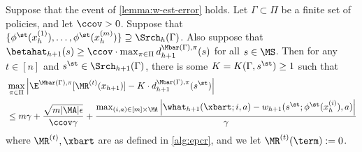 






\begin{lemma}\label{lemma:target-error-trunc}
Suppose that the event of \cref{lemma:w-est-error} holds. Let $\Gamma \subset \Pi$ be a finite set of policies, and let $\ccov > 0$. Suppose that $\{\phi^\st(x_h^{(1)}),\dots,\phi^\st(x_h^{(m)})\} \supseteq \Srch_h(\Gamma)$. Also suppose that $\betahat_{h+1}(s) \geq \ccov \cdot \max_{\pi\in\Pi} d^{\Mbar(\Gamma),\pi}_{h+1}(s)$ for all $s \in \MS$. Then for any $t \in [n]$ and $s^\st \in \Srch_{h+1}(\Gamma)$, there is some $K = K(\Gamma,s^\st) \geq 1$ such that
\begin{align*}
&\max_{\pi\in\Pi} \left|\E^{\Mbar(\Gamma),\pi}[\MR^{(t)}(x_{h+1})] - K \cdot d^{\Mbar(\Gamma),\pi}_{h+1}(s^\st)\right| \\
&\leq m\gamma + \frac{\sqrt{m|\MA|\epsilon}}{\ccov \gamma} + \frac{\max_{(i,a) \in [m]\times\MA} \left|\what_{h+1}(\xbart;i,a) - w_{h+1}(s^\st; \phi^\st(x_h^{(i)}),a)\right|}{\gamma}
\end{align*}
where $\MR^{(t)}, \xbart$ are as defined in \cref{alg:epcr}, and we let $\MR^{(t)}(\term):=0$.
\end{lemma}

